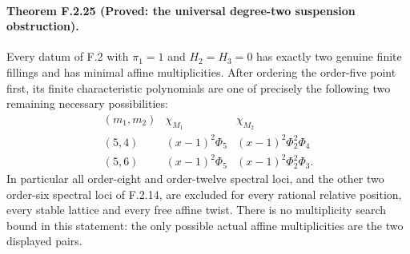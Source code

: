 \paragraph{Theorem F.2.25 (Proved: the universal degree-two suspension obstruction).}
Every datum of F.2 with $\pi_1=1$ and $H_2=H_3=0$ has
exactly two genuine finite fillings and has minimal affine
multiplicities.  After ordering the order-five point first,
its finite characteristic polynomials are one of precisely
the following two remaining necessary possibilities:
\[
\begin{array}{c|c|c}
 (m_1,m_2)&\chi_{M_1}&\chi_{M_2}\\\hline
 (5,4)&(x-1)^2\Phi_5&(x-1)^2\Phi_2^2\Phi_4\\
 (5,6)&(x-1)^2\Phi_5&(x-1)^2\Phi_2^2\Phi_3.
\end{array}
 \tag{F.S1}
\]
In particular all order-eight and order-twelve spectral
loci, and the other two order-six spectral loci of F.2.14,
are excluded for every rational relative position, every
stable lattice and every free affine twist.
There is no multiplicity search bound in this statement:
the only possible actual affine multiplicities are the
two displayed pairs.

